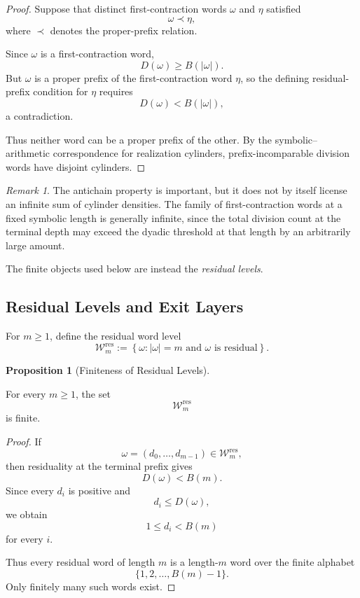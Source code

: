\documentclass[12pt, oneside]{article}
\numberwithin{equation}{section}
\theoremstyle{definition}
\newtheorem{proposition}{Proposition}[section]
\theoremstyle{plain}
\theoremstyle{remark}
\newtheorem*{remark}{Remark}
\begin{document}
\begin{proof}
Suppose that distinct first-contraction words \(\omega\) and \(\eta\)
satisfied
\[
\omega\prec\eta,
\]
where \(\prec\) denotes the proper-prefix relation.

Since \(\omega\) is a first-contraction word,
\[
D(\omega)\ge B(|\omega|).
\]
But \(\omega\) is a proper prefix of the first-contraction word \(\eta\), so
the defining residual-prefix condition for \(\eta\) requires
\[
D(\omega)<B(|\omega|),
\]
a contradiction.

Thus neither word can be a proper prefix of the other. By the
symbolic--arithmetic correspondence for realization cylinders,
prefix-incomparable division words have disjoint cylinders.
\end{proof}

\begin{remark}
The antichain property is important, but it does not by itself license an
infinite sum of cylinder densities. The family of first-contraction words
at a fixed symbolic length is generally infinite, since the total division
count at the terminal depth may exceed the dyadic threshold at that length
by an arbitrarily large amount.

The finite objects used below are instead the \emph{residual levels}.
\end{remark}

\subsection{Residual Levels and Exit Layers}

For \(m\ge1\), define the residual word level
\[
\mathcal W_m^{\mathrm{res}}
:=
\left\{
\omega:
|\omega|=m
\text{ and }
\omega\text{ is residual}
\right\}.
\]

\begin{proposition}[Finiteness of Residual Levels]
\label{prop:residual-level-finite}

For every \(m\ge1\), the set
\[
\mathcal W_m^{\mathrm{res}}
\]
is finite.
\end{proposition}

\begin{proof}
If
\[
\omega=(d_0,\dots,d_{m-1})
\in\mathcal W_m^{\mathrm{res}},
\]
then residuality at the terminal prefix gives
\[
D(\omega)<B(m).
\]
Since every \(d_i\) is positive and
\[
d_i\le D(\omega),
\]
we obtain
\[
1\le d_i<B(m)
\]
for every \(i\).

Thus every residual word of length \(m\) is a length-\(m\) word over the
finite alphabet
\[
\{1,2,\dots,B(m)-1\}.
\]
Only finitely many such words exist.
\end{proof}
\end{document}
